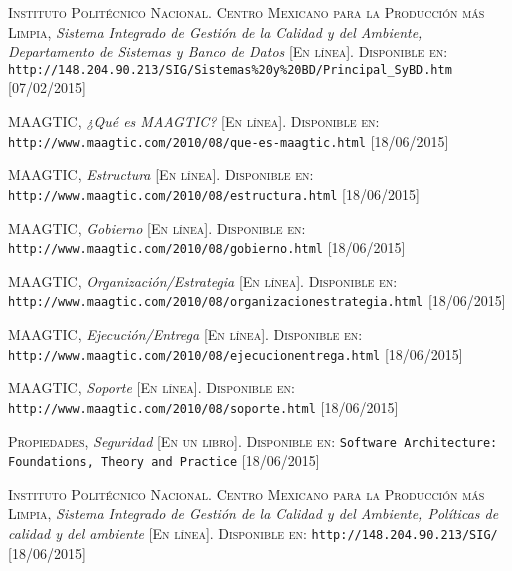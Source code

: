 \begin{thebibliography}{X}
		\textsc{Instituto Politécnico Nacional. Centro Mexicano para la Producción más Limpia},
		\textit{Sistema Integrado de Gestión de la Calidad y del Ambiente, Departamento de Sistemas y Banco de Datos}
		\textsc{[En línea]. Disponible en:}
		\texttt{http://148.204.90.213/SIG/Sistemas\%20y\%20BD/Principal\_SyBD.htm}
		\textsc{[07/02/2015]}
		
		\textsc{MAAGTIC},
		\textit{¿Qué es MAAGTIC?}
		\textsc{[En línea]. Disponible en:}
		\texttt{http://www.maagtic.com/2010/08/que-es-maagtic.html}
		\textsc{[18/06/2015]}
		
		\textsc{MAAGTIC},
		\textit{Estructura}
		\textsc{[En línea]. Disponible en:}
		\texttt{http://www.maagtic.com/2010/08/estructura.html}
		\textsc{[18/06/2015]}
		
		\textsc{MAAGTIC},
		\textit{Gobierno}
		\textsc{[En línea]. Disponible en:}
		\texttt{http://www.maagtic.com/2010/08/gobierno.html}
		\textsc{[18/06/2015]}

		\textsc{MAAGTIC},
		\textit{Organización/Estrategia}
		\textsc{[En línea]. Disponible en:}
		\texttt{http://www.maagtic.com/2010/08/organizacionestrategia.html}
		\textsc{[18/06/2015]}

		\textsc{MAAGTIC},
		\textit{Ejecución/Entrega}
		\textsc{[En línea]. Disponible en:}
		\texttt{http://www.maagtic.com/2010/08/ejecucionentrega.html}
		\textsc{[18/06/2015]}
		
		\textsc{MAAGTIC},
		\textit{Soporte}
		\textsc{[En línea]. Disponible en:}
		\texttt{http://www.maagtic.com/2010/08/soporte.html}
		\textsc{[18/06/2015]}
		
		\textsc{Propiedades},
		\textit{Seguridad}
		\textsc{[En un libro]. Disponible en:}
		\texttt{Software Architecture: Foundations, Theory and Practice}
		\textsc{[18/06/2015]}
		
		\textsc{Instituto Politécnico Nacional. Centro Mexicano para la Producción más Limpia},
		\textit{Sistema Integrado de Gestión de la Calidad y del Ambiente, Políticas de calidad y del ambiente}
		\textsc{[En línea]. Disponible en:}
		\texttt{http://148.204.90.213/SIG/}
		\textsc{[18/06/2015]}
		
\end{thebibliography}
